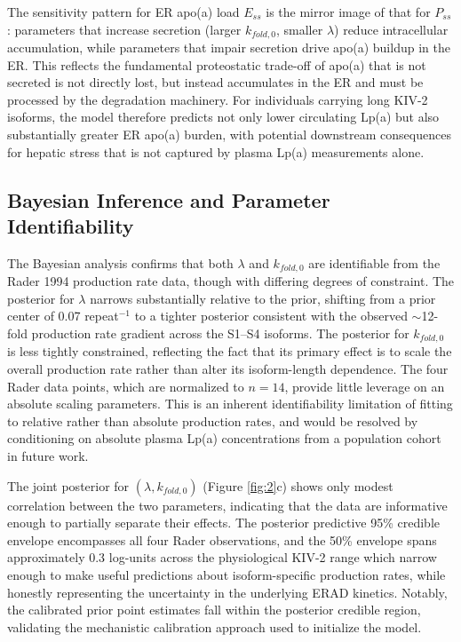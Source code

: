 \documentclass[12pt,letterpaper]{article}
\begin{document}
The sensitivity pattern for ER apo(a) load $E_{ss}$ is the mirror image of that for $P_{ss}$: parameters that increase secretion (larger $k_{fold,0}$, smaller $\lambda$) reduce intracellular accumulation, while parameters that impair secretion drive apo(a) buildup in the ER. This reflects the fundamental proteostatic trade-off of apo(a) that is not secreted is not directly lost, but instead accumulates in the ER and must be processed by the degradation machinery. For individuals carrying long KIV-2 isoforms, the model therefore predicts not only lower circulating Lp(a) but also substantially greater ER apo(a) burden, with potential downstream consequences for hepatic stress that is not captured by plasma Lp(a) measurements alone.

\subsection{Bayesian Inference and Parameter Identifiability}

The Bayesian analysis confirms that both $\lambda$ and $k_{fold,0}$ are identifiable from the Rader 1994 production rate data, though with differing degrees of constraint. The posterior for $\lambda$ narrows substantially relative to the prior, shifting from a prior center of 0.07 repeat$^{-1}$ to a tighter posterior consistent with the observed $\sim$12-fold production rate gradient across the S1–S4 isoforms. The posterior for $k_{fold,0}$ is less tightly constrained, reflecting the fact that its primary effect is to scale the overall production rate rather than alter its isoform-length dependence. The four Rader data points, which are normalized to $n = 14$, provide little leverage on an absolute scaling parameters. This is an inherent identifiability limitation of fitting to relative rather than absolute production rates, and would be resolved by conditioning on absolute plasma Lp(a) concentrations from a population cohort \citep{mukamel2021protein, aric1989atherosclerosis, ad1996community, tan2018cohort, guan2015race, taylor2005toward, joshi2023heterogeneity, bild2002multi, sudlow2015uk, halldorsson2022sequences} in future work.

The joint posterior for $(\lambda, k_{fold,0})$ (Figure \ref{fig:2}c) shows only modest correlation between the two parameters, indicating that the data are informative enough to partially separate their effects. The posterior predictive 95\% credible envelope encompasses all four Rader observations, and the 50\% envelope spans approximately 0.3 log-units across the physiological KIV-2 range which narrow enough to make useful predictions about isoform-specific production rates, while honestly representing the uncertainty in the underlying ERAD kinetics. Notably, the calibrated prior point estimates fall within the posterior credible region, validating the mechanistic calibration approach used to initialize the model.
\end{document}
